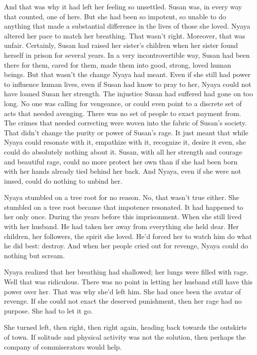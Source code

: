\documentclass{amsart}
\begin{document}
And that was why it had left her feeling so unsettled. Susan was, in every way that counted, one of hers. But she had been so impotent, so unable to do anything that made a substantial difference in the lives of those she loved. Nyaya altered her pace to match her breathing. That wasn't right. Moreover, that was unfair. Certainly, Susan had raised her sister's children when her sister found herself in prison for several years. In a very incontrovertible way, Susan had been there for them, cared for them, made them into good, strong, loved human beings. But that wasn't the change Nyaya had meant. Even if she still had power to influence human lives, even if Susan had know to pray to her, Nyaya could not have loaned Susan her strength. The injustice Susan had suffered had gone on too long. No one was calling for vengeance, or could even point to a discrete set of acts that needed avenging. There was no set of people to exact payment from. The crimes that needed correcting were woven into the fabric of Susan's society. That didn't change the purity or power of Susan's rage. It just meant that while Nyaya could resonate with it, empathize with it, recognize it, desire it even, she could do absolutely nothing about it. Susan, with all her strength and courage and beautiful rage, could no more protect her own than if she had been born with her hands already tied behind her back. And Nyaya, even if she were not imsed, could do nothing to unbind her.

Nyaya stumbled on a tree root for no reason. No, that wasn't true either. She stumbled on a tree root because that impotence resonated. It had happened to her only once. During the years before this imprisonment. When she still lived with her husband. He had taken her away from everything she held dear. Her children, her followers, the spirit she loved. He'd forced her to watch him do what he did best: destroy. And when her people cried out for revenge, Nyaya could do nothing but scream.

Nyaya realized that her breathing had shallowed; her lungs were filled with rage. Well that was ridiculous. There was no point in letting her husband still have this power over her. That was why she'd left him. She had once been the avatar of revenge. If she could not exact the deserved punishment, then her rage had no purpose. She had to let it go.

She turned left, then right, then right again, heading back towards the outskirts of town. If solitude and physical activity was not the solution, then perhaps the company of commiserators would help. 
\end{document}
